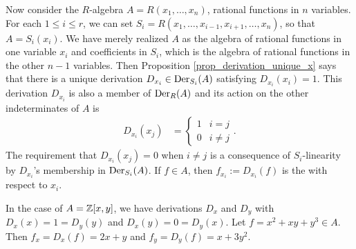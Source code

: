 Now consider the $R$-algebra $A = R(x_1, \ldots, x_n)$, rational functions in $n$ variables.
For each $1 \leq i \leq r$,
we can set $S_i = R(x_1, \ldots, x_{i-1}, x_{i+1}, \ldots, x_n)$, so that $A = S_i(x_i)$.
We have merely realized $A$ as the algebra of rational functions in one variable $x_i$ and coefficients in $S_i$,
which is the algebra of rational functions in the other $n - 1$ variables.
Then Proposition \ref{prop_derivation_unique_x} says that
there is a unique derivation $D_{x_i} \in \operatorname{Der}_{S_i}(A)$ satisfying $D_{x_i}(x_i) = 1$.
This derivation $D_{x_i}$ is also a member of $\operatorname{Der}_R(A)$ and its action on the other indeterminates of $A$ is
\begin{align*}
  D_{x_i}(x_j) &= \begin{cases} 1 & i = j \\ 0 & i \neq j \end{cases}.
\end{align*}
The requirement that $D_{x_i}(x_j) = 0$ when $i \neq j$ is a consequence of $S_i$-linearity
by $D_{x_i}$'s membership in $\operatorname{Der}_{S_i}(A)$.
If $f \in A$, then $f_{x_i} := D_{x_i}(f)$ is the  with respect to $x_i$.

\begin{example}
  In the case of $A = \mathbb{Z}[x,y]$, we have derivations $D_x$ and $D_y$ with
  $D_x(x) = 1 = D_y(y)$ and $D_x(y) = 0 = D_y(x)$.
  Let $f = x^2 + xy + y^3 \in A$.
  Then $f_x = D_x(f) = 2x + y$ and $f_y = D_y(f) = x + 3y^2$.
\end{example}

\begin{comment}
\begin{proposition}
  Let $D \in \Der_K(A)$ be a derivation.
  Let $I$ be an ideal of $A$.
  Then $D$ induces a derivation $D^* \in \Der_K(A/I)$ defined by
    \[ D^*([a]) = [D(a)]. \]
\end{proposition}
\begin{proof}
  For each $a \in A$, denote the equivalence class containing $a$ in $A/I$ by $\bar a$.
  We show first that this map is well-defined.
  Suppose $\bar a = \bar b$.
  Then $\bar{a-b} = \bar 0$ and
    \[ D^*(\bar a) = D^*(\bar a - \bar{a-b}) = D^*(\bar{a-a+b}) = D^*(\bar b). \]
  We must also show that $D^*(\bar k \cdot \bar a) = \bar k \cdot D^*(\bar a)$
  and $D^*(\bar a \cdot \bar b) = D^*(\bar a) \cdot \bar b + \bar a \cdot D^*(\bar b)$.
    \[ D^*(\bar k \cdot \bar a) = D^*(\bar{ka}) = \bar{D(ka)} = \bar{kD(a)} = \bar k \cdot \bar{D(a)} = \bar k \cdot D^*(\bar a) \]
  \begin{align*}
    D^*(\bar a \cdot \bar b)
      &= D^*(\bar{ab})
       = \bar{D(ab)}
       = \bar{D(a)b + aD(b)} \\
       &= \bar{D(a)} \cdot \bar b + \bar a \cdot \bar{D(b)}
       = D^*(\bar a) \cdot \bar b + \bar a \cdot D^*(\bar b)
  \end{align*}
\end{proof}
With this we can extend formal derivatives of functions in $K[x,y]$ and $K(x,y)$ to formal derivatives of functions in $K[C]$ and $K(C)$.
\end{comment}

